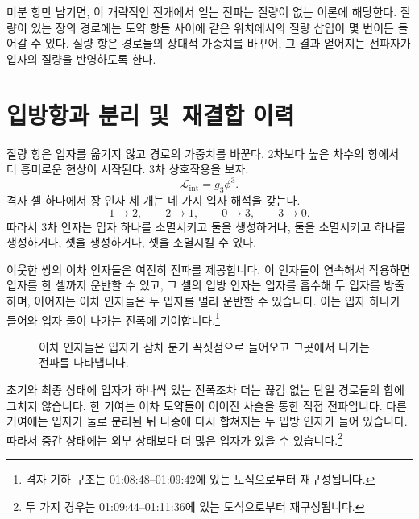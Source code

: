 미분 항만 남기면, 이 개략적인 전개에서 얻는 전파는 질량이 없는 이론에 해당한다. 질량이 있는 장의 경로에는 도약 항들 사이에 같은 위치에서의 질량 삽입이 몇 번이든 들어갈 수 있다. 질량 항은 경로들의 상대적 가중치를 바꾸어, 그 결과 얻어지는 전파자가 입자의 질량을 반영하도록 한다.

\section{입방항과 분리 및--재결합 이력}

질량 항은 입자를 옮기지 않고 경로의 가중치를 바꾼다. 2차보다 높은 차수의 항에서 더 흥미로운 현상이 시작된다. 3차 상호작용을 보자.
\begin{equation}
\mathcal{L}_{\mathrm{int}}=g_3\phi^3.
\end{equation}
격자 셀 하나에서 장 인자 세 개는 네 가지 입자 해석을 갖는다.
\begin{equation}
1\longrightarrow 2,
\qquad
2\longrightarrow 1,
\qquad
0\longrightarrow 3,
\qquad
3\longrightarrow 0.
\end{equation}
따라서 3차 인자는 입자 하나를 소멸시키고 둘을 생성하거나, 둘을 소멸시키고 하나를 생성하거나, 셋을 생성하거나, 셋을 소멸시킬 수 있다.

이웃한 쌍의 이차 인자들은 여전히 전파를 제공합니다. 이 인자들이 연속해서 작용하면 입자를 한 셀까지 운반할 수 있고, 그 셀의 입방 인자는 입자를 흡수해 두 입자를 방출하며, 이어지는 이차 인자들은 두 입자를 멀리 운반할 수 있습니다. 이는 입자 하나가 들어와 입자 둘이 나가는 진폭에 기여합니다.\footnote{격자 기하 구조는 01:08:48--01:09:42에 있는 도식으로부터 재구성됩니다.}

\begin{figure}[htbp]
\centering
{}
\caption{이차 인자들은 입자가 삼차 분기 꼭짓점으로 들어오고 그곳에서 나가는 전파를 나타냅니다.}
\end{figure}

초기와 최종 상태에 입자가 하나씩 있는 진폭조차 더는 끊김 없는 단일 경로들의 합에 그치지 않습니다. 한 기여는 이차 도약들이 이어진 사슬을 통한 직접 전파입니다. 다른 기여에는 입자가 둘로 분리된 뒤 나중에 다시 합쳐지는 두 입방 인자가 들어 있습니다. 따라서 중간 상태에는 외부 상태보다 더 많은 입자가 있을 수 있습니다.\footnote{두 가지 경우는 01:09:44--01:11:36에 있는 도식으로부터 재구성됩니다.}


